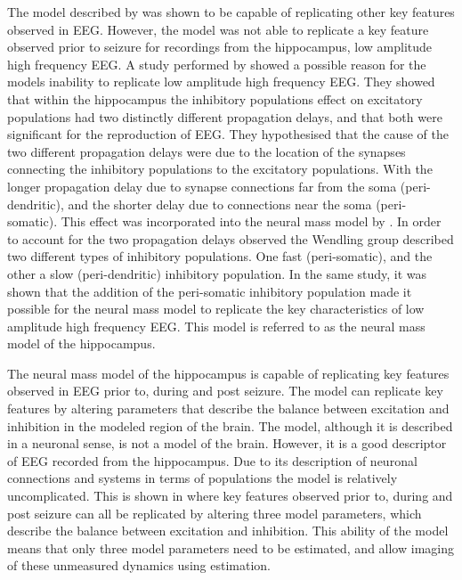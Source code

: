 The model described by \cite{jansen1995electroencephalogram} was shown to be capable of replicating other key features observed in EEG. However, the model was not able to replicate a key feature observed prior to seizure for recordings from the hippocampus, low amplitude high frequency EEG. A study performed by \cite{white2000networks} showed a possible reason for the models inability to replicate low amplitude high frequency EEG. They showed that within the hippocampus the inhibitory populations effect on excitatory populations had two distinctly different propagation delays, and that both were significant for the reproduction of EEG. They hypothesised that the cause of the two different propagation delays were due to the location of the synapses connecting the inhibitory populations to the excitatory populations. With the longer propagation delay due to synapse connections far from the soma (peri-dendritic), and the shorter delay due to connections near the soma (peri-somatic).  This effect was incorporated into the neural mass model by \cite{wendling2002epileptic}. In order to account for the two propagation delays observed the Wendling group described two different types of inhibitory populations. One fast (peri-somatic), and the other a slow (peri-dendritic) inhibitory population. In the same study, it was shown that the addition of the peri-somatic inhibitory population made it possible for the neural mass model to replicate the key characteristics of low amplitude high frequency EEG. This model is referred to as the neural mass model of the hippocampus.


The neural mass model of the hippocampus is capable of replicating key features observed in EEG prior to, during and post seizure. The model can replicate key features by altering parameters that describe the balance between excitation and inhibition in the modeled region of the brain. The model, although it is described in a neuronal sense, is not a model of the brain. However, it is a good descriptor of EEG recorded from the hippocampus. Due to its description of neuronal connections and systems in terms of populations the model is relatively uncomplicated. This is shown in \cite{wendling2002epileptic} where key features observed prior to, during and post seizure can all be replicated by altering three model parameters, which describe the balance between excitation and inhibition. This ability of the model means that only three model parameters need to be estimated, and allow imaging of these unmeasured dynamics using estimation. 

